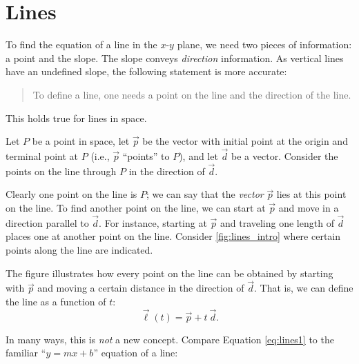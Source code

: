 \section{Lines}\label{sec:lines}

To find the equation of a line in the $x$-$y$ plane, we need two pieces of information: a point and the slope. The slope conveys \textit{direction} information. As vertical lines have an undefined slope, the following statement is more accurate:

\begin{quotation}
\noindent To define a line, one needs a point on the line and the direction of the line.
\end{quotation}

This holds true for lines in space.\bigskip

Let $P$ be a point in space, let $\vec p$ be the vector with initial point at the origin and terminal point at $P$ (i.e., $\vec p$ ``points'' to $P$), and let $\vec d$ be a vector. Consider the points on the line through $P$ in the direction of $\vec d$. 

Clearly one point on the line is $P$; we can say that the \emph{vector} $\vec p$ lies at this point on the line. To find another point on the line, we can start at $\vec p$ and move in a  direction parallel to $\vec d$. For instance, starting at $\vec p$ and traveling one length of $\vec d$ places one at another point on the line. Consider \autoref{fig:lines_intro} where certain points along the line are indicated. 

The figure illustrates how every point on the line can be obtained by starting with $\vec p$ and moving a certain distance in the direction of $\vec d$. That is, we can define the line as a function of $t$:
\begin{equation}\vec\ell(t) = \vec p + t\ \vec d.\label{eq:lines1}\end{equation}

In many ways, this is \textit{not} a new concept. Compare Equation \eqref{eq:lines1} to the familiar ``$y=mx+b$'' equation of a line:

